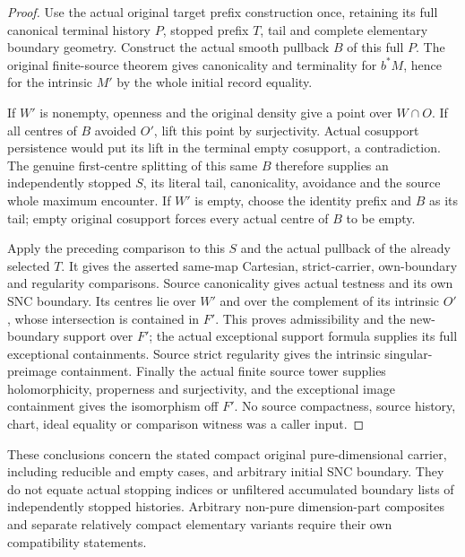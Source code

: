\begin{proof}
Use the actual original target prefix construction once, retaining its
full canonical terminal history $P$, stopped prefix $T$, tail and
complete elementary boundary geometry.  Construct the actual smooth
pullback $B$ of this full $P$.  The original finite-source theorem gives
canonicality and terminality for $b^*M$, hence for the intrinsic $M'$
by the whole initial record equality.

If $W'$ is nonempty, openness and the original density give a point over
$W\cap O$.  If all centres of $B$ avoided $O'$, lift this point by
surjectivity.  Actual cosupport persistence would put its lift in the
terminal empty cosupport, a contradiction.  The genuine first-centre
splitting of this same $B$ therefore supplies an independently stopped
$S$, its literal tail, canonicality, avoidance and the source whole
maximum encounter.  If $W'$ is empty, choose the identity prefix and
$B$ as its tail; empty original cosupport forces every actual centre
of $B$ to be empty.

Apply the preceding comparison to this $S$ and the actual pullback of
the already selected $T$.  It gives the asserted same-map Cartesian,
strict-carrier, own-boundary and regularity comparisons.  Source
canonicality gives actual testness and its own SNC boundary.  Its
centres lie over $W'$ and over the complement of its intrinsic $O'$,
whose intersection is contained in $F'$.  This proves admissibility
and the new-boundary support over $F'$; the actual exceptional support
formula supplies its full exceptional containments.  Source strict
regularity gives the intrinsic singular-preimage containment.  Finally
the actual finite source tower supplies holomorphicity, properness
and surjectivity, and the exceptional image containment gives the
isomorphism off $F'$.  No source compactness, source history, chart,
ideal equality or comparison witness was a caller input.
\end{proof}

\begin{remark}
These conclusions concern the stated compact original pure-dimensional
carrier, including reducible and empty cases, and arbitrary initial
SNC boundary.  They do not equate actual stopping indices or unfiltered
accumulated boundary lists of independently stopped histories.
Arbitrary non-pure dimension-part composites and separate relatively
compact elementary variants require their own compatibility statements.
\end{remark}
